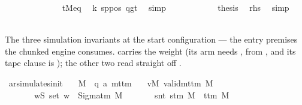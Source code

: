 \begin{isabellebody}
\ \ \ \ \ \ \ \ \ \ \ \ \isamarkupfalse%
\ tM{\isacharprime}{\kern0pt}{\isacharunderscore}{\kern0pt}eq\ \isamarkupfalse%
\ k{}\ sppos\ qgt\ \isamarkupfalse%
\ simp\isanewline
\ \ \ \ \ \ \ \ \ \ \isamarkupfalse%
\ {\isacharquery}{\kern0pt}thesis\ \isamarkupfalse%
\ rhs\ \isamarkupfalse%
\ simp\isanewline
\ \ \ \ \ \ \ \ \isamarkupfalse%
\isanewline
\ \ \ \ \ \ \isamarkupfalse%
\isanewline
\ \ \ \ \isamarkupfalse%
\isanewline
\ \ \isamarkupfalse%
\isanewline
{}\isamarkupfalse%
%
\endisatagproof
{\isafoldproof}%
%
\isadelimproof
%
\endisadelimproof
%
\begin{isamarkuptext}%
The three simulation invariants at the start configuration —
  the entry premises the chunked engine 
  consumes.   carries the weight (its
   arm needs , 
  from , and its tape clause is
  ); the other two read straight
  off .%
\end{isamarkuptext}\isamarkuptrue%
\isamarkupfalse%
\ ar{\isacharunderscore}{\kern0pt}simulates{\isacharunderscore}{\kern0pt}init{\isacharcolon}{\kern0pt}\isanewline
\ \ \ M\ {\isacharcolon}{\kern0pt}{\isacharcolon}{\kern0pt}\ {\isachardoublequoteopen}{\isacharparenleft}{\kern0pt}{\isacharprime}{\kern0pt}q{\isacharcomma}{\kern0pt}\ {\isacharprime}{\kern0pt}a{\isacharparenright}{\kern0pt}\ mttm{\isachardoublequoteclose}\isanewline
\ \ \ vM{\isacharcolon}{\kern0pt}\ {\isachardoublequoteopen}valid{\isacharunderscore}{\kern0pt}mttm\ M{\isachardoublequoteclose}\isanewline
\ \ \ \ \ \ \ wS{\isacharcolon}{\kern0pt}\ {\isachardoublequoteopen}set\ w\ {\isasymsubseteq}\ Sigma{\isacharunderscore}{\kern0pt}tm\ M{\isachardoublequoteclose}\isanewline
\ \ \ \ \ \ \ snt{\isacharcolon}{\kern0pt}\ {\isachardoublequoteopen}s{\isacharunderscore}{\kern0pt}tm\ M\ {\isasymnoteq}\ t{\isacharunderscore}{\kern0pt}tm\ M{\isachardoublequoteclose}\isanewline

\end{isabellebody}
